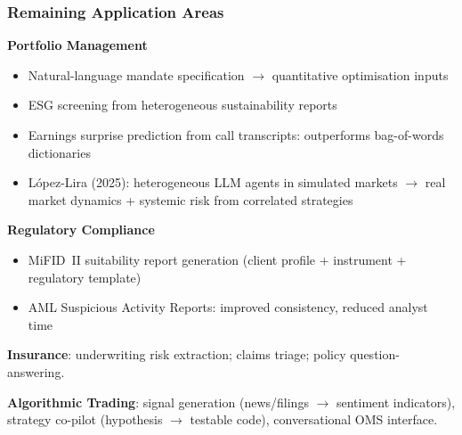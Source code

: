 \documentclass[9pt,t]{beamer}
\begin{document}
\begin{frame}
\frametitle{Remaining Application Areas}

\textbf{Portfolio Management}
\begin{itemize}
  \item Natural-language mandate specification $\to$ quantitative optimisation inputs
  \item ESG screening from heterogeneous sustainability reports
  \item Earnings surprise prediction from call transcripts: outperforms bag-of-words dictionaries
  \item L\'{o}pez-Lira (2025): heterogeneous LLM agents in simulated markets $\to$ real market dynamics + systemic risk from correlated strategies
\end{itemize}

\medskip
\textbf{Regulatory Compliance}
\begin{itemize}
  \item MiFID~II suitability report generation (client profile + instrument + regulatory template)
  \item AML Suspicious Activity Reports: improved consistency, reduced analyst time
\end{itemize}

\medskip
\textbf{Insurance}: underwriting risk extraction; claims triage; policy question-answering.

\medskip
\textbf{Algorithmic Trading}: signal generation (news/filings $\to$ sentiment indicators), strategy co-pilot (hypothesis $\to$ testable code), conversational OMS interface.
\end{frame}
\end{document}
